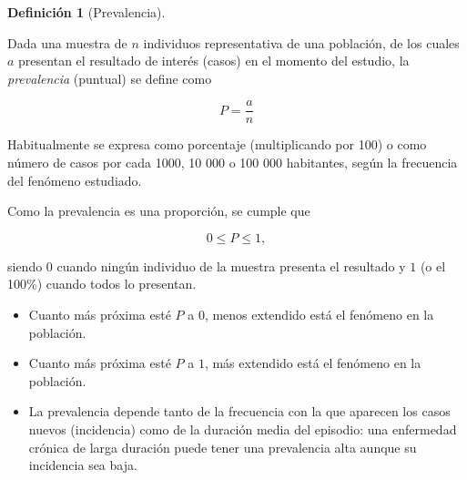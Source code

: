 \documentclass[
  spanish,
  a4paper,
]{scrreport}
\providecommand{\tightlist}{%
  \setlength{\itemsep}{0pt}\setlength{\parskip}{0pt}}
\theoremstyle{definition}
\theoremstyle{definition}
\newtheorem{definition}{Definición}[chapter]
\theoremstyle{remark}
\begin{document}
\begin{definition}[Prevalencia]\protect\hypertarget{def-transversales-prevalencia}{}\label{def-transversales-prevalencia}

Dada una muestra de \(n\) individuos representativa de una población, de
los cuales \(a\) presentan el resultado de interés (casos) en el momento
del estudio, la \emph{prevalencia} (puntual) se define como

\[P = \frac{a}{n}\]

Habitualmente se expresa como porcentaje (multiplicando por 100) o como
número de casos por cada 1000, 10 000 o 100 000 habitantes, según la
frecuencia del fenómeno estudiado.

\end{definition}

\begin{tcolorbox}[enhanced jigsaw, arc=.35mm, bottomrule=.15mm, bottomtitle=1mm, breakable, colback=white, colbacktitle=quarto-callout-important-color!10!white, colframe=quarto-callout-important-color-frame, coltitle=black, left=2mm, leftrule=.75mm, opacityback=0, opacitybacktitle=0.6, rightrule=.15mm, title=\textcolor{quarto-callout-important-color}{\faExclamation}\hspace{0.5em}{Importante}, titlerule=0mm, toprule=.15mm, toptitle=1mm]

Como la prevalencia es una proporción, se cumple que

\[0 \leq P \leq 1,\]

siendo \(0\) cuando ningún individuo de la muestra presenta el resultado
y \(1\) (o el 100\%) cuando todos lo presentan.

\end{tcolorbox}

\begin{tcolorbox}[enhanced jigsaw, arc=.35mm, bottomrule=.15mm, bottomtitle=1mm, breakable, colback=white, colbacktitle=quarto-callout-note-color!10!white, colframe=quarto-callout-note-color-frame, coltitle=black, left=2mm, leftrule=.75mm, opacityback=0, opacitybacktitle=0.6, rightrule=.15mm, title=\textcolor{quarto-callout-note-color}{\faInfo}\hspace{0.5em}{Interpretación}, titlerule=0mm, toprule=.15mm, toptitle=1mm]

\begin{itemize}
\tightlist
\item
  Cuanto más próxima esté \(P\) a \(0\), menos extendido está el
  fenómeno en la población.
\item
  Cuanto más próxima esté \(P\) a \(1\), más extendido está el fenómeno
  en la población.
\item
  La prevalencia depende tanto de la frecuencia con la que aparecen los
  casos nuevos (incidencia) como de la duración media del episodio: una
  enfermedad crónica de larga duración puede tener una prevalencia alta
  aunque su incidencia sea baja.
\end{itemize}

\end{tcolorbox}
\end{document}
